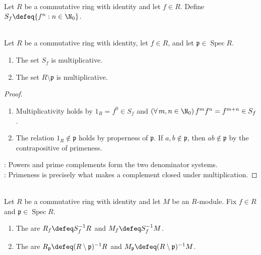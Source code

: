 \begin{definition} \label{def:principal-denominator-set} \\
Let $R$ be a commutative ring with identity and let $f\in R$. Define $S_f\defeq\{f^n:n\in\N_0\}$.
\end{definition}

\begin{proposition} \label{prop:canonical-localization-denominator-sets}
\\
Let $R$ be a commutative ring with identity, let $f\in R$, and let $\mathfrak{p}\in\operatorname{Spec}R$.
\begin{enumerate}[label=(\roman*)]
\setlength{\itemsep}{0pt}
\item The set $S_f$ is multiplicative.
\item The set $R\setminus\mathfrak{p}$ is multiplicative.
\end{enumerate}
\begin{proof}
\begin{enumerate}[label=(\roman*)]
\setlength{\itemsep}{0pt}
\item Multiplicativity holds by $1_R=f^0\in S_f$ and $(\forall\,m,n\in\N_0)\,f^m f^n=f^{m+n}\in S_f$.
\item The relation $1_R\notin\mathfrak{p}$ holds by properness of $\mathfrak{p}$. If $a,b\notin\mathfrak{p}$, then $ab\notin\mathfrak{p}$ by the contrapositive of primeness.
\end{enumerate}
: Powers and prime complements form the two denominator systems.\\
: Primeness is precisely what makes a complement closed under multiplication.
\end{proof}
\end{proposition}

\begin{definition} \label{def:principal-and-prime-localizations}
\\
Let $R$ be a commutative ring with identity and let $M$ be an $R$-module. Fix $f\in R$ and $\mathfrak{p}\in\operatorname{Spec}R$.
\begin{enumerate}[label=(\roman*)]
\setlength{\itemsep}{0pt}
\item The  are $R_f\defeq S_f^{-1}R$ and $M_f\defeq S_f^{-1}M$.
\item The  are $R_{\mathfrak{p}}\defeq(R\setminus\mathfrak{p})^{-1}R$ and $M_{\mathfrak{p}}\defeq(R\setminus\mathfrak{p})^{-1}M$.
\end{enumerate}
\end{definition}

